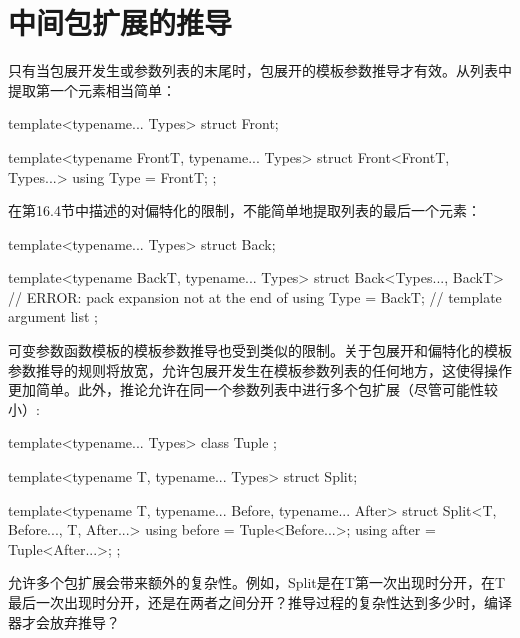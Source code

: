 \section{中间包扩展的推导}
只有当包展开发生或参数列表的末尾时，包展开的模板参数推导才有效。从列表中提取第一个元素相当简单：

\begin{cpp}
template<typename... Types>
struct Front;

template<typename FrontT, typename... Types>
struct Front<FrontT, Types...> {
	using Type = FrontT;
};
\end{cpp}

在第16.4节中描述的对偏特化的限制，不能简单地提取列表的最后一个元素：

\begin{cpp}
template<typename... Types>
struct Back;

template<typename BackT, typename... Types>
struct Back<Types..., BackT> { // ERROR: pack expansion not at the end of
	using Type = BackT; // template argument list
};
\end{cpp}

可变参数函数模板的模板参数推导也受到类似的限制。关于包展开和偏特化的模板参数推导的规则将放宽，允许包展开发生在模板参数列表的任何地方，这使得操作更加简单。此外，推论允许在同一个参数列表中进行多个包扩展（尽管可能性较小）:

\begin{cpp}
template<typename... Types> class Tuple {};

template<typename T, typename... Types>
struct Split;

template<typename T, typename... Before, typename... After>
struct Split<T, Before..., T, After...> {
	using before = Tuple<Before...>;
	using after = Tuple<After...>;
};
\end{cpp}

允许多个包扩展会带来额外的复杂性。例如，Split是在T第一次出现时分开，在T最后一次出现时分开，还是在两者之间分开？推导过程的复杂性达到多少时，编译器才会放弃推导？













































